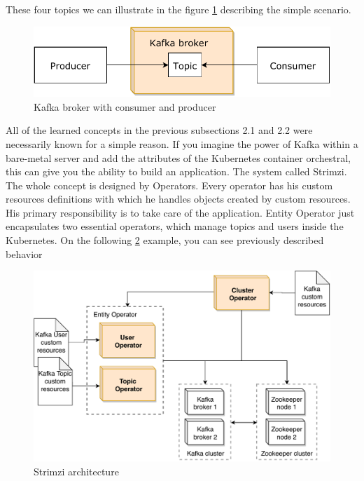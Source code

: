 \documentclass{ExcelAtFIT}
\begin{document}
These four topics we can illustrate in the figure \ref{fig:strizmi:consumerProducerTopicKafka} describing the simple scenario. 

\begin{figure}[h!]
	\centering
	\includegraphics[width=1\linewidth]{images/02-strimzi/KafkaConsumerProducerBig.pdf}
	\caption{Kafka broker with consumer and producer}
	\label{fig:strizmi:consumerProducerTopicKafka}
\end{figure}

All of the learned concepts in the previous subsections 2.1 and 2.2 were necessarily known for a simple reason. If you imagine the power of Kafka within a bare-metal server and add the attributes of the Kubernetes container orchestral, this can give you the ability to build an application. The system called Strimzi. The whole concept is designed by Operators. Every operator has his custom resources definitions with which he handles objects created by custom resources. His primary responsibility is to take care of the application. Entity Operator just encapsulates two essential operators, which manage topics and users inside the Kubernetes. On the following \ref{fig:strizmi:architecture} example, you can see previously described behavior

\begin{figure}[h!]
	\centering
	\includegraphics[width=1\linewidth]{images/02-strimzi/StrimziArchitectureBig.pdf}
	\caption{Strimzi architecture}
	\label{fig:strizmi:architecture}
\end{figure}
\end{document}
